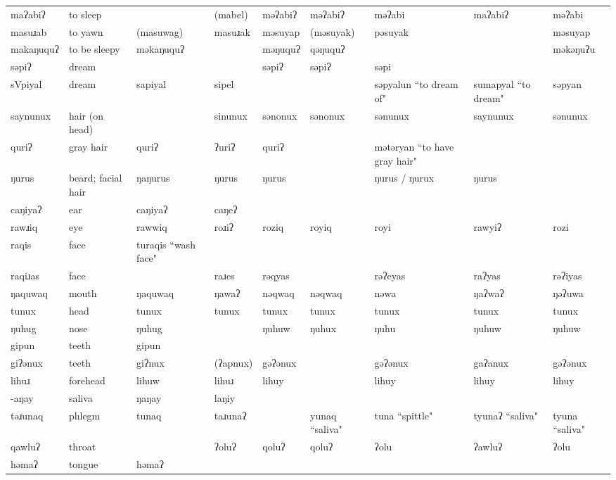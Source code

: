 \begin{landscape}
\begin{longtable}{*{9}{p{}}}
\text{*}maʔabiʔ & to sleep &  & (mabel) & məʔabiʔ & məʔabiʔ & məʔabi & maʔabiʔ & məʔabi\\
\text{*}masuɹab & to yawn & (masuwag) & masuɹak & məsuyap & (məsuyak) & pəsuyak &  & məsuyap\\
\text{*}makaŋuquʔ & to be sleepy & məkaŋuquʔ &  & məŋuquʔ & qəŋuquʔ &  &  & məkəŋuʔu\\
\text{*}səpiʔ & dream &  &  & səpiʔ & səpiʔ & səpi &  & \\
\text{*}sVpiyal & dream & sapiyal & sipel &  &  & səpyalun ``to dream of" & sumapyal ``to dream" & səpyan\\
\text{*}saynunux & hair (on head) &  & sinunux & sənonux & sənonux & sənunux & saynunux & sənunux\\
\text{*}quriʔ & gray hair & quriʔ & ʔuriʔ & quriʔ &  & mətəryan ``to have gray hair" &  & \\
\text{*}ŋurus & beard; facial hair & ŋaŋurus & ŋurus & ŋurus &  & ŋurus / ŋurux & ŋurus & \\
\text{*}caŋiyaʔ & ear & caŋiyaʔ & caŋeʔ &  &  &  &  & \\
\text{*}rawɹiq & eye & rawwiq & roɹiʔ & roziq & royiq & royi & rawyiʔ & rozi\\
\text{*}raqis & face & turaqis ``wash face" &  &  &  &  &  & \\
\text{*}raqiɹas & face &  & raɹes & rəqyas &  & rəʔeyas & raʔyas & rəʔiyas\\
\text{*}ŋaquwaq & mouth & ŋaquwaq & ŋawaʔ & nəqwaq & nəqwaq & nəwa & ŋaʔwaʔ & ŋəʔuwa\\
\text{*}tunux & head & tunux & tunux & tunux & tunux & tunux & tunux & tunux\\
\text{*}ŋuhug & nose & ŋuhug &  & ŋuhuw & ŋuhux & ŋuhu & ŋuhuw & ŋuhuw\\
\text{*}gipun & teeth & gipun &  &  &  &  &  & \\
\text{*}giʔənux & teeth & giʔnux & (ʔapnux) & gəʔənux &  & gəʔənux & gaʔanux & gəʔənux\\
\text{*}lihuɹ & forehead & lihuw & lihuɹ & lihuy &  & lihuy & lihuy & lihuy\\
\text{*}-aŋay & saliva & ŋaŋay & laŋiy &  &  &  &  & \\
\text{*}təɹunaq & phlegm & tunaq & taɹunaʔ &  & yunaq ``saliva" & tuna ``spittle" & tyunaʔ ``saliva" & tyuna ``saliva"\\
\text{*}qawluʔ & throat &  & ʔoluʔ & qoluʔ & qoluʔ & ʔolu & ʔawluʔ & ʔolu\\
\text{*}həmaʔ & tongue & həmaʔ &  &  &  &  &  & \\

\end{longtable}
\end{landscape}
